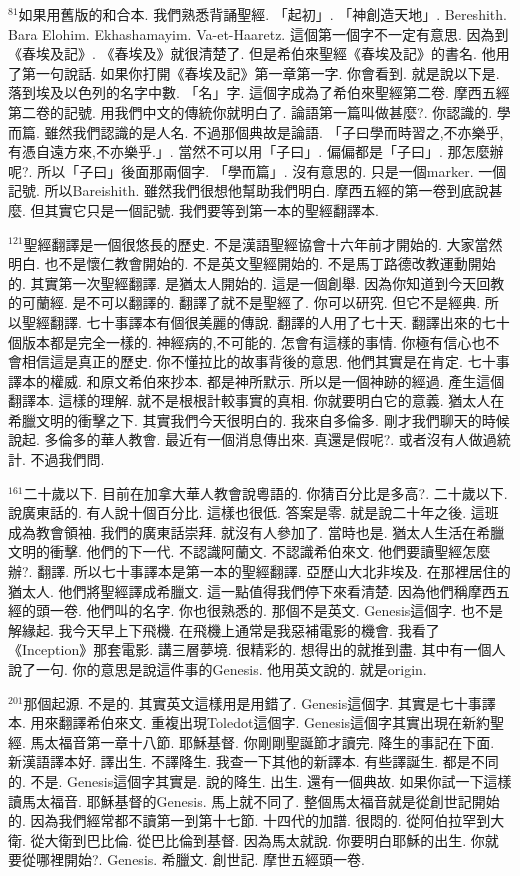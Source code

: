 \documentclass{book}
\begin{document}
$^{81}$如果用舊版的和合本.
我們熟悉背誦聖經.
「起初」.
「神創造天地」.
Bereshith.
Bara Elohim.
Ekhashamayim.
Va-et-Haaretz.
這個第一個字不一定有意思.
因為到《春埃及記》.
《春埃及》就很清楚了.
但是希伯來聖經《春埃及記》的書名.
他用了第一句說話.
如果你打開《春埃及記》第一章第一字.
你會看到.
就是說以下是.
落到埃及以色列的名字中數.
「名」字.
這個字成為了希伯來聖經第二卷.
摩西五經第二卷的記號.
用我們中文的傳統你就明白了.
論語第一篇叫做甚麼?.
你認識的.
學而篇.
雖然我們認識的是人名.
不過那個典故是論語.
「子曰學而時習之,不亦樂乎,有憑自遠方來,不亦樂乎.」.
當然不可以用「子曰」.
偏偏都是「子曰」.
那怎麼辦呢?.
所以「子曰」後面那兩個字.
「學而篇」.
沒有意思的.
只是一個marker.
一個記號.
所以Bareishith.
雖然我們很想他幫助我們明白.
摩西五經的第一卷到底說甚麼.
但其實它只是一個記號.
我們要等到第一本的聖經翻譯本.

$^{121}$聖經翻譯是一個很悠長的歷史.
不是漢語聖經協會十六年前才開始的.
大家當然明白.
也不是懷仁教會開始的.
不是英文聖經開始的.
不是馬丁路德改教運動開始的.
其實第一次聖經翻譯.
是猶太人開始的.
這是一個創舉.
因為你知道到今天回教的可蘭經.
是不可以翻譯的.
翻譯了就不是聖經了.
你可以研究.
但它不是經典.
所以聖經翻譯.
七十事譯本有個很美麗的傳說.
翻譯的人用了七十天.
翻譯出來的七十個版本都是完全一樣的.
神經病的,不可能的.
怎會有這樣的事情.
你極有信心也不會相信這是真正的歷史.
你不懂拉比的故事背後的意思.
他們其實是在肯定.
七十事譯本的權威.
和原文希伯來抄本.
都是神所默示.
所以是一個神跡的經過.
產生這個翻譯本.
這樣的理解.
就不是根根計較事實的真相.
你就要明白它的意義.
猶太人在希臘文明的衝擊之下.
其實我們今天很明白的.
我來自多倫多.
剛才我們聊天的時候說起.
多倫多的華人教會.
最近有一個消息傳出來.
真還是假呢?.
或者沒有人做過統計.
不過我們問.

$^{161}$二十歲以下.
目前在加拿大華人教會說粵語的.
你猜百分比是多高?.
二十歲以下.
說廣東話的.
有人說十個百分比.
這樣也很低.
答案是零.
就是說二十年之後.
這班成為教會領袖.
我們的廣東話崇拜.
就沒有人參加了.
當時也是.
猶太人生活在希臘文明的衝擊.
他們的下一代.
不認識阿蘭文.
不認識希伯來文.
他們要讀聖經怎麼辦?.
翻譯.
所以七十事譯本是第一本的聖經翻譯.
亞歷山大北非埃及.
在那裡居住的猶太人.
他們將聖經譯成希臘文.
這一點值得我們停下來看清楚.
因為他們稱摩西五經的頭一卷.
他們叫的名字.
你也很熟悉的.
那個不是英文.
Genesis這個字.
也不是解緣起.
我今天早上下飛機.
在飛機上通常是我惡補電影的機會.
我看了《Inception》那套電影.
講三層夢境.
很精彩的.
想得出的就推到盡.
其中有一個人說了一句.
你的意思是說這件事的Genesis.
他用英文說的.
就是origin.

$^{201}$那個起源.
不是的.
其實英文這樣用是用錯了.
Genesis這個字.
其實是七十事譯本.
用來翻譯希伯來文.
重複出現Toledot這個字.
Genesis這個字其實出現在新約聖經.
馬太福音第一章十八節.
耶穌基督.
你剛剛聖誕節才讀完.
降生的事記在下面.
新漢語譯本好.
譯出生.
不譯降生.
我查一下其他的新譯本.
有些譯誕生.
都是不同的.
不是.
Genesis這個字其實是.
說的降生.
出生.
還有一個典故.
如果你試一下這樣讀馬太福音.
耶穌基督的Genesis.
馬上就不同了.
整個馬太福音就是從創世記開始的.
因為我們經常都不讀第一到第十七節.
十四代的加譜.
很悶的.
從阿伯拉罕到大衛.
從大衛到巴比倫.
從巴比倫到基督.
因為馬太就說.
你要明白耶穌的出生.
你就要從哪裡開始?.
Genesis.
希臘文.
創世記.
摩世五經頭一卷.
\end{document}
